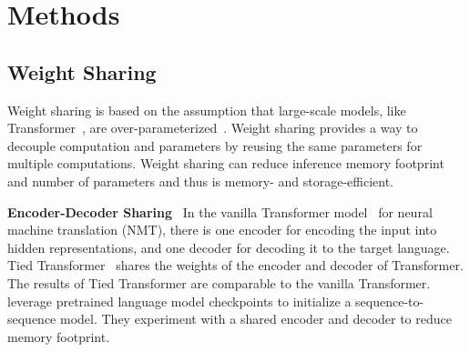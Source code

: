 \documentclass[letterpaper]{article} %
\newcommand{\paratitle}[1]{\noindent\textbf{#1}\ }
\begin{document}
\begin{table}[t]
    \centering
    \caption{A summary of various pruning methods. $\mathbf{S}$ are saliency scores used to determine which weights to prune. The table style is borrowed from \citet{sanh2020movement}.}
    \label{tab:prune}
\end{table}

\section{Methods}

\subsection{Weight Sharing}
Weight sharing is based on the assumption that large-scale models, like Transformer~\citep{transformer}, are over-parameterized~\citep{li2020train}. Weight sharing provides a way to decouple computation and parameters by reusing the same parameters for multiple computations. Weight sharing can reduce inference memory footprint and number of parameters and thus is memory- and storage-efficient.

\paratitle{Encoder-Decoder Sharing} In the vanilla Transformer model~\citep{transformer} for neural machine translation (NMT), there is one encoder for encoding the input into hidden representations, and one decoder for decoding it to the target language. Tied Transformer~\citep{xia2019tied} shares the weights of the encoder and decoder of Transformer. The results of Tied Transformer are comparable to the vanilla Transformer. \citet{rothe2020leveraging} leverage pretrained language model checkpoints to initialize a sequence-to-sequence model. They experiment with a shared encoder and decoder to reduce memory footprint.
\end{document}
